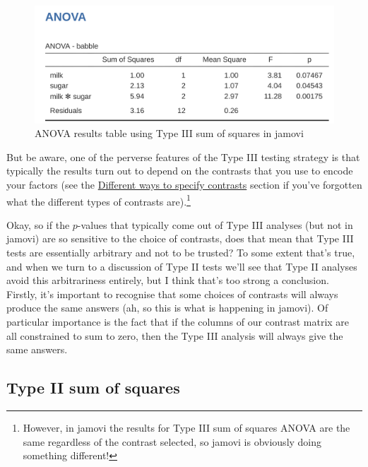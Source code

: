\documentclass[
  a4paper,
]{book}
\begin{document}
\begin{figure}

\includegraphics[width=1\textwidth,height=\textheight]{images/fig14-29.png} \hfill{}

\caption{\label{fig-fig14-29}ANOVA results table using Type III sum of
squares in jamovi}

\end{figure}

But be aware, one of the perverse features of the Type III testing
strategy is that typically the results turn out to depend on the
contrasts that you use to encode your factors (see the
\protect\hyperlink{different-ways-to-specify-contrasts}{Different ways
to specify contrasts} section if you've forgotten what the different
types of contrasts are).\footnote{However, in jamovi the results for
  Type III sum of squares ANOVA are the same regardless of the contrast
  selected, so jamovi is obviously doing something different!}

Okay, so if the \(p\)-values that typically come out of Type III
analyses (but not in jamovi) are so sensitive to the choice of
contrasts, does that mean that Type III tests are essentially arbitrary
and not to be trusted? To some extent that's true, and when we turn to a
discussion of Type II tests we'll see that Type II analyses avoid this
arbitrariness entirely, but I think that's too strong a conclusion.
Firstly, it's important to recognise that some choices of contrasts will
always produce the same answers (ah, so this is what is happening in
jamovi). Of particular importance is the fact that if the columns of our
contrast matrix are all constrained to sum to zero, then the Type III
analysis will always give the same answers.

\hypertarget{type-ii-sum-of-squares}{%
\subsection{Type II sum of squares}\label{type-ii-sum-of-squares}}
\end{document}
